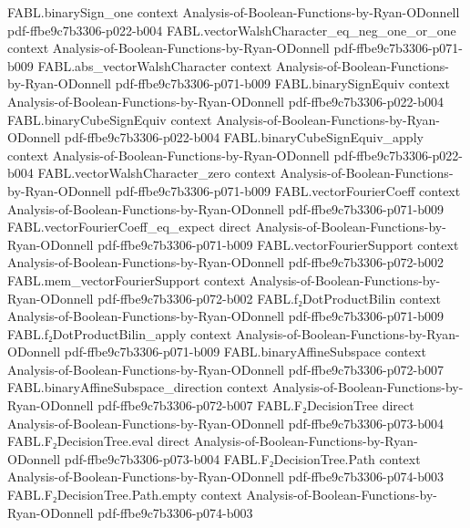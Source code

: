 \begin{theorem}
\proofstep
  {FABL.binarySign_one}
  {context}
  {Analysis-of-Boolean-Functions-by-Ryan-ODonnell}
  {pdf-ffbe9c7b3306-p022-b004}
\proofstep
  {FABL.vectorWalshCharacter_eq_neg_one_or_one}
  {context}
  {Analysis-of-Boolean-Functions-by-Ryan-ODonnell}
  {pdf-ffbe9c7b3306-p071-b009}
\proofstep
  {FABL.abs_vectorWalshCharacter}
  {context}
  {Analysis-of-Boolean-Functions-by-Ryan-ODonnell}
  {pdf-ffbe9c7b3306-p071-b009}
\proofstep
  {FABL.binarySignEquiv}
  {context}
  {Analysis-of-Boolean-Functions-by-Ryan-ODonnell}
  {pdf-ffbe9c7b3306-p022-b004}
\proofstep
  {FABL.binaryCubeSignEquiv}
  {context}
  {Analysis-of-Boolean-Functions-by-Ryan-ODonnell}
  {pdf-ffbe9c7b3306-p022-b004}
\proofstep
  {FABL.binaryCubeSignEquiv_apply}
  {context}
  {Analysis-of-Boolean-Functions-by-Ryan-ODonnell}
  {pdf-ffbe9c7b3306-p022-b004}
\proofstep
  {FABL.vectorWalshCharacter_zero}
  {context}
  {Analysis-of-Boolean-Functions-by-Ryan-ODonnell}
  {pdf-ffbe9c7b3306-p071-b009}
\proofstep
  {FABL.vectorFourierCoeff}
  {context}
  {Analysis-of-Boolean-Functions-by-Ryan-ODonnell}
  {pdf-ffbe9c7b3306-p071-b009}
\proofstep
  {FABL.vectorFourierCoeff_eq_expect}
  {direct}
  {Analysis-of-Boolean-Functions-by-Ryan-ODonnell}
  {pdf-ffbe9c7b3306-p071-b009}
\proofstep
  {FABL.vectorFourierSupport}
  {context}
  {Analysis-of-Boolean-Functions-by-Ryan-ODonnell}
  {pdf-ffbe9c7b3306-p072-b002}
\proofstep
  {FABL.mem_vectorFourierSupport}
  {context}
  {Analysis-of-Boolean-Functions-by-Ryan-ODonnell}
  {pdf-ffbe9c7b3306-p072-b002}
\proofstep
  {FABL.f₂DotProductBilin}
  {context}
  {Analysis-of-Boolean-Functions-by-Ryan-ODonnell}
  {pdf-ffbe9c7b3306-p071-b009}
\proofstep
  {FABL.f₂DotProductBilin_apply}
  {context}
  {Analysis-of-Boolean-Functions-by-Ryan-ODonnell}
  {pdf-ffbe9c7b3306-p071-b009}
\proofstep
  {FABL.binaryAffineSubspace}
  {context}
  {Analysis-of-Boolean-Functions-by-Ryan-ODonnell}
  {pdf-ffbe9c7b3306-p072-b007}
\proofstep
  {FABL.binaryAffineSubspace_direction}
  {context}
  {Analysis-of-Boolean-Functions-by-Ryan-ODonnell}
  {pdf-ffbe9c7b3306-p072-b007}
\proofstep
  {FABL.F₂DecisionTree}
  {direct}
  {Analysis-of-Boolean-Functions-by-Ryan-ODonnell}
  {pdf-ffbe9c7b3306-p073-b004}
\proofstep
  {FABL.F₂DecisionTree.eval}
  {direct}
  {Analysis-of-Boolean-Functions-by-Ryan-ODonnell}
  {pdf-ffbe9c7b3306-p073-b004}
\proofstep
  {FABL.F₂DecisionTree.Path}
  {context}
  {Analysis-of-Boolean-Functions-by-Ryan-ODonnell}
  {pdf-ffbe9c7b3306-p074-b003}
\proofstep
  {FABL.F₂DecisionTree.Path.empty}
  {context}
  {Analysis-of-Boolean-Functions-by-Ryan-ODonnell}
  {pdf-ffbe9c7b3306-p074-b003}
\proofstep

\end{theorem}
